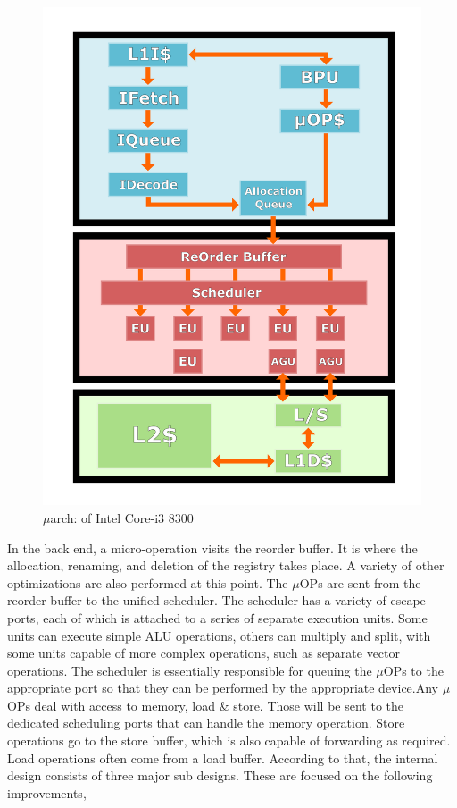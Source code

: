 \documentclass[a4paper,11pt]{article}
\begin{document}
\begin{figure}
	\includegraphics[scale= 0.05]{figures/intuarch}
	\caption{$\mu$arch: of Intel Core-i3 8300}
\end{figure}
In the back end, a micro-operation visits the reorder buffer. It is where the allocation, renaming, and deletion of the registry takes place. A variety of other optimizations are also performed at this point. The $\mu$OPs are sent from the reorder buffer to the unified scheduler. The scheduler has a variety of escape ports, each of which is attached to a series of separate execution units. Some units can execute simple ALU operations, others can multiply and split, with some units capable of more complex operations, such as separate vector operations. The scheduler is essentially responsible for queuing the $\mu$OPs to the appropriate port so that they can be performed by the appropriate device.Any $\mu$OPs deal with access to memory, load \& store. Those will be sent to the dedicated scheduling ports that can handle the memory operation. Store operations go to the store buffer, which is also capable of forwarding as required. Load operations often come from a load buffer. According to that, the internal design consists of three major sub designs. These are focused on the following improvements, 
\end{document}
